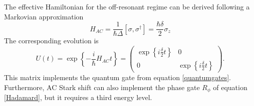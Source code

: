 The effective Hamiltonian for the off-resonant regime can be derived following a Markovian approximation \cite{acstarkhamiltonian}
\begin{equation}
H_{AC} = \frac{1}{\hbar \Delta} [\sigma,\sigma^\dagger] = \frac{\hbar \delta}{2}\sigma_z
\end{equation}
The corresponding evolution is
\begin{equation}
\label{acstarkrotation}
U(t) = \exp\left\{-\frac{i}{\hbar} H_{AC} t \right\} =
 \begin{pmatrix}
   \exp\left\{i\frac{\delta}{2}t\right\} & 0\\
   0 & \exp\left\{i\frac{\delta}{2}t\right\}
\end{pmatrix}.
\end{equation}
This matrix implements the quantum gate from equation \eqref{quantumgates}. Furthermore, AC Stark shift can also implement the phase gate $R_{\phi}$ of equation \eqref{Hadamard}, but it requires a third energy level.
